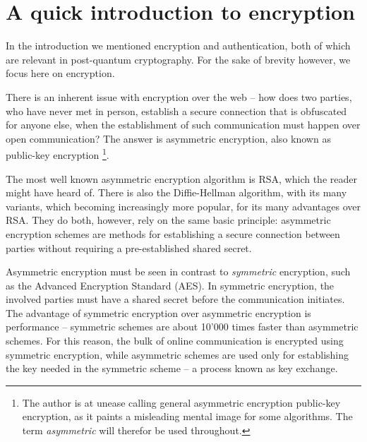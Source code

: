 \documentclass[conference]{IEEEtran}
\begin{document}
\section{A quick introduction to encryption}
In the introduction we mentioned encryption and authentication, both of which are relevant in post-quantum cryptography.
For the sake of brevity however, we focus here on encryption.

There is an inherent issue with encryption over the web -- how does two parties, who have never met in person, establish a secure connection that is obfuscated for anyone else, when the establishment of such communication must happen over open communication?
The answer is asymmetric encryption, also known as public-key encryption
\footnote{The author is at unease calling general asymmetric encryption public-key encryption, as it paints a misleading mental image for some algorithms. The term \emph{asymmetric} will therefor be used throughout.}.

The most well known asymmetric encryption algorithm is RSA, which the reader might have heard of.
There is also the Diffie-Hellman algorithm, with its many variants, which becoming increasingly more popular, for its many advantages over RSA\cite{cryptographyStallings}.
They do both, however, rely on the same basic principle: asymmetric encryption schemes are methods for establishing a secure connection between parties without requiring a pre-established shared secret.


Asymmetric encryption must be seen in contrast to \emph{symmetric} encryption, such as the Advanced Encryption Standard (AES).
In symmetric encryption, the involved parties must have a shared secret before the communication initiates.
The advantage of symmetric encryption over asymmetric encryption is performance -- symmetric schemes are about 10'000 times faster than asymmetric schemes.
For this reason, the bulk of online communication is encrypted using symmetric encryption, while asymmetric schemes are used only for establishing the key needed in the symmetric scheme -- a process known as key exchange.
\end{document}
